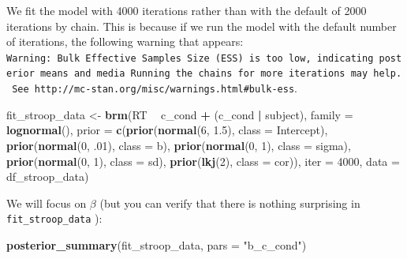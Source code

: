 \documentclass[12pt,]{krantz}
\newenvironment{Shaded}{\begin{snugshade}}{\end{snugshade}}
\newcommand{\KeywordTok}[1]{\textcolor[rgb]{0.13,0.29,0.53}{\textbf{#1}}}
\newcommand{\DataTypeTok}[1]{\textcolor[rgb]{0.13,0.29,0.53}{#1}}
\newcommand{\DecValTok}[1]{\textcolor[rgb]{0.00,0.00,0.81}{#1}}
\newcommand{\FloatTok}[1]{\textcolor[rgb]{0.00,0.00,0.81}{#1}}
\newcommand{\StringTok}[1]{\textcolor[rgb]{0.31,0.60,0.02}{#1}}
\newcommand{\OperatorTok}[1]{\textcolor[rgb]{0.81,0.36,0.00}{\textbf{#1}}}
\newcommand{\NormalTok}[1]{#1}
\theoremstyle{definition}
\theoremstyle{definition}
\theoremstyle{definition}
\theoremstyle{remark}
\begin{document}
We fit the model with 4000 iterations rather than with the default of
2000 iterations by chain. This is because if we run the model with the
default number of iterations, the following warning that appears:
\texttt{Warning:\ Bulk\ Effective\ Samples\ Size\ (ESS)\ is\ too\ low,\ indicating\ posterior\ means\ and\ media\ Running\ the\ chains\ for\ more\ iterations\ may\ help.\ See\ http://mc-stan.org/misc/warnings.html\#bulk-ess}.

\begin{Shaded}
\begin{Highlighting}[]
\NormalTok{fit_stroop_data <-}\StringTok{ }\KeywordTok{brm}\NormalTok{(RT }\OperatorTok{~}\StringTok{ }\NormalTok{c_cond }\OperatorTok{+}\StringTok{ }\NormalTok{(c_cond }\OperatorTok{|}\StringTok{ }\NormalTok{subject),}
                   \DataTypeTok{family =} \KeywordTok{lognormal}\NormalTok{(),}
                  \DataTypeTok{prior =}
                      \KeywordTok{c}\NormalTok{(}\KeywordTok{prior}\NormalTok{(}\KeywordTok{normal}\NormalTok{(}\DecValTok{6}\NormalTok{, }\FloatTok{1.5}\NormalTok{), }\DataTypeTok{class =}\NormalTok{ Intercept),}
                        \KeywordTok{prior}\NormalTok{(}\KeywordTok{normal}\NormalTok{(}\DecValTok{0}\NormalTok{, }\FloatTok{.01}\NormalTok{), }\DataTypeTok{class =}\NormalTok{ b),}
                        \KeywordTok{prior}\NormalTok{(}\KeywordTok{normal}\NormalTok{(}\DecValTok{0}\NormalTok{, }\DecValTok{1}\NormalTok{), }\DataTypeTok{class =}\NormalTok{ sigma),}
                        \KeywordTok{prior}\NormalTok{(}\KeywordTok{normal}\NormalTok{(}\DecValTok{0}\NormalTok{, }\DecValTok{1}\NormalTok{), }\DataTypeTok{class =}\NormalTok{ sd),}
                        \KeywordTok{prior}\NormalTok{(}\KeywordTok{lkj}\NormalTok{(}\DecValTok{2}\NormalTok{), }\DataTypeTok{class =}\NormalTok{ cor)),}
                  \DataTypeTok{iter =} \DecValTok{4000}\NormalTok{,}
                  \DataTypeTok{data =}\NormalTok{ df_stroop_data)}
\end{Highlighting}
\end{Shaded}

We will focus on \(\beta\) (but you can verify that there is nothing
surprising in \texttt{fit\_stroop\_data} ):

\begin{Shaded}
\begin{Highlighting}[]
\KeywordTok{posterior_summary}\NormalTok{(fit_stroop_data, }\DataTypeTok{pars =} \StringTok{"b_c_cond"}\NormalTok{)}
\end{Highlighting}
\end{Shaded}
\end{document}
